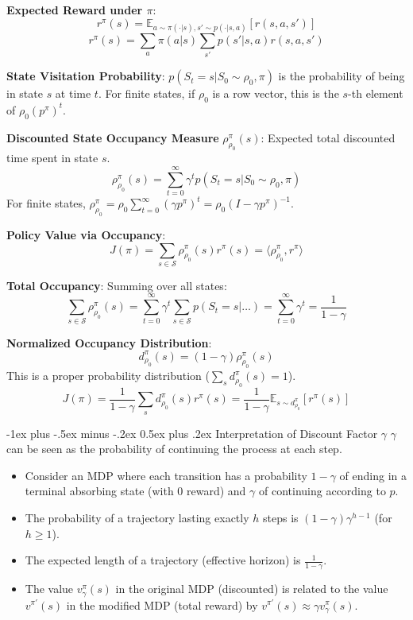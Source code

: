 \documentclass[10pt,landscape]{article}
\makeatletter
\renewcommand{\section}{\@startsection{section}{1}{0mm}%
                                {-1ex plus -.5ex minus -.2ex}%
                                {0.5ex plus .2ex}%
                                {\normalfont\large\bfseries}}
\makeatother
\begin{document}
\begin{multicols}{3}
    \textbf{Expected Reward under $\pi$}:
    $$ r^\pi(s) = \mathbb{E}_{a \sim \pi(\cdot|s), s' \sim p(\cdot|s,a)} [r(s,a,s')] $$
    $$ r^\pi(s) = \sum_{a} \pi(a|s) \sum_{s'} p(s'|s,a) r(s,a,s') $$

    \textbf{State Visitation Probability}:
    $p(S_t=s | S_0 \sim \rho_0, \pi)$ is the probability of being in state $s$ at time $t$. For finite states, if $\rho_0$ is a row vector, this is the $s$-th element of $\rho_0 (p^\pi)^t$.

    \textbf{Discounted State Occupancy Measure} $\rho^\pi_{\rho_0}(s)$: Expected total discounted time spent in state $s$.
    $$ \rho^\pi_{\rho_0}(s) = \sum_{t=0}^\infty \gamma^t p(S_t=s | S_0 \sim \rho_0, \pi) $$
    For finite states, $\rho^\pi_{\rho_0} = \rho_0 \sum_{t=0}^\infty (\gamma p^\pi)^t = \rho_0 (I - \gamma p^\pi)^{-1}$.

    \textbf{Policy Value via Occupancy}:
    $$ J(\pi) = \sum_{s \in \mathcal{S}} \rho^\pi_{\rho_0}(s) r^\pi(s) = \langle \rho^\pi_{\rho_0}, r^\pi \rangle $$

    \textbf{Total Occupancy}: Summing over all states:
    $$ \sum_{s \in \mathcal{S}} \rho^\pi_{\rho_0}(s) = \sum_{t=0}^\infty \gamma^t \sum_{s \in \mathcal{S}} p(S_t=s | \dots) = \sum_{t=0}^\infty \gamma^t = \frac{1}{1-\gamma} $$

    \textbf{Normalized Occupancy Distribution}:
    $$ d^\pi_{\rho_0}(s) = (1-\gamma) \rho^\pi_{\rho_0}(s) $$
    This is a proper probability distribution ($\sum_s d^\pi_{\rho_0}(s) = 1$).
    $$ J(\pi) = \frac{1}{1-\gamma} \sum_s d^\pi_{\rho_0}(s) r^\pi(s) = \frac{1}{1-\gamma} \mathbb{E}_{s \sim d^\pi_{\rho_0}} [r^\pi(s)] $$

    \section{Interpretation of Discount Factor $\gamma$}
    $\gamma$ can be seen as the probability of continuing the process at each step.
    \begin{itemize}[label={--},leftmargin=4mm, itemsep=-.4mm]
        \item Consider an MDP where each transition has a probability $1-\gamma$ of ending in a terminal absorbing state (with 0 reward) and $\gamma$ of continuing according to $p$.
        \item The probability of a trajectory lasting exactly $h$ steps is $(1-\gamma)\gamma^{h-1}$ (for $h \ge 1$).
        \item The expected length of a trajectory (effective horizon) is $\frac{1}{1-\gamma}$.
        \item The value $v^\pi_\gamma(s)$ in the original MDP (discounted) is related to the value $v^{\pi'}(s)$ in the modified MDP (total reward) by $v^{\pi'}(s) \approx \gamma v^\pi_\gamma(s)$.
    \end{itemize}


\end{multicols}
\end{document}
